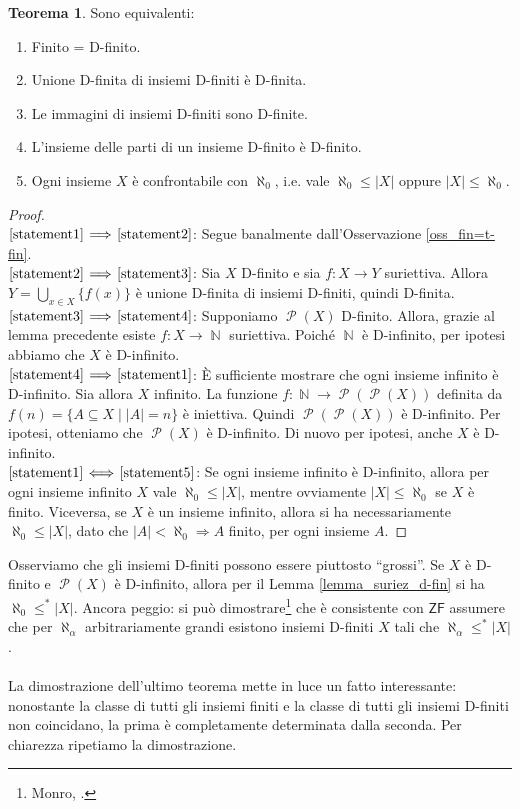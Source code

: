 \documentclass[12pt,a4paper]{report}
\theoremstyle{definition}
\newtheorem{teo}{Teorema}[section]  %
\theoremstyle{num.custom-title}
\DeclareMathOperator{\PP}{\mathcal{P}}
\DeclareMathOperator{\N}{\mathbb{N}}
\DeclareMathOperator{\imp}{\Rightarrow}
\newcommand{\ZF}{\ensuremath{\mathsf{ZF}}\xspace}
\newcommand{\Implies}[2]{$\text{\ref{statement#1}}\!\implies\!\text{\ref{statement#2}}$}%
\newcommand{\punto}[1]{\item \label{statement#1}}
\newenvironment{equivalence}
    {\begin{enumerate}[label=(\arabic*),ref=(\arabic*)]
    }
    { 
	\end{enumerate}
    }
\begin{document}
\begin{teo}\label{caratt_fin=d-fin} Sono equivalenti:
\begin{equivalence}
\punto{1} Finito = D-finito.
\punto{2} Unione D-finita di insiemi D-finiti è D-finita.
\punto{3} Le immagini di insiemi D-finiti sono D-finite.
\punto{4} L'insieme delle parti di un insieme D-finito è D-finito.
\punto{5} Ogni insieme $X$ è confrontabile con $\aleph_0$, i.e. vale $\aleph_0 \leq |X|$ oppure $|X| \leq \aleph_0$.
\end{equivalence}
\begin{proof} \ \\
\Implies{1}{2}: Segue banalmente dall'Osservazione \ref{oss_fin=t-fin}.\\
\Implies{2}{3}: Sia $X$ D-finito e sia $f: X \to Y$ suriettiva. Allora $Y=\bigcup_{x \in X} \{f(x)\}$ è unione D-finita di insiemi D-finiti, quindi D-finita.\\
\Implies{3}{4}: Supponiamo $\PP(X)$ D-finito. Allora, grazie al lemma precedente esiste $f: X \to \N$ suriettiva. Poiché $\N$ è D-infinito, per ipotesi abbiamo che $X$ è D-infinito.\\
\Implies{4}{1}: È sufficiente mostrare che ogni insieme infinito è D-infinito. Sia allora $X$ infinito. La funzione $f: \N \to \PP(\PP(X))$ definita da $f(n)=\{A \subseteq X \mid |A|=n\}$ è iniettiva. Quindi $\PP(\PP(X))$ è D-infinito. Per ipotesi, otteniamo che $\PP(X)$ è D-infinito. Di nuovo per ipotesi, anche $X$ è D-infinito.\\
$\text{\ref{statement1}}\!\iff\!\text{\ref{statement5}}$: Se ogni insieme infinito è D-infinito, allora per ogni insieme infinito $X$ vale $\aleph_0 \leq |X|$, mentre ovviamente $|X| \leq \aleph_0$ se $X$ è finito. Viceversa, se $X$ è un insieme infinito, allora si ha necessariamente $\aleph_0 \leq |X|$, dato che $|A|<\aleph_0 \imp A$ finito, per ogni insieme $A$.
\end{proof}
\end{teo}

Osserviamo che gli insiemi D-finiti possono essere piuttosto ``grossi''. Se $X$ è D-finito e $\PP(X)$ è D-infinito, allora per il Lemma \ref{lemma_suriez_d-fin} si ha $\aleph_0 \leq^* |X|$. Ancora peggio: si può dimostrare\footnote{Monro, \cite{Mon75:Herrlich}.} che è consistente con \ZF assumere che per $\aleph_\alpha$ arbitrariamente grandi esistono insiemi D-finiti $X$ tali che $\aleph_\alpha \leq^* |X|$.\\
\\
La dimostrazione dell'ultimo teorema mette in luce un fatto interessante: nonostante la classe di tutti gli insiemi finiti e la classe di tutti gli insiemi D-finiti non coincidano, la prima è completamente determinata dalla seconda. Per chiarezza ripetiamo la dimostrazione.
\end{document}
